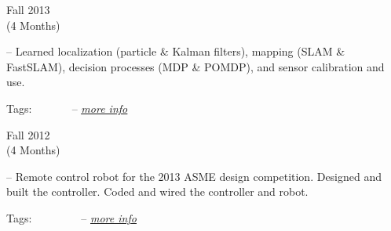 
%

\flushleft \begin{minipage}[t]{\dateColWidth}
Fall 2013 \\
(4 Months)
\end{minipage}
\begin{minipage}[t]{0.8\textwidth}
	--
	Learned localization (particle \& Kalman filters), mapping (SLAM \& FastSLAM), decision processes (MDP \& POMDP), and sensor calibration and use.
	
	Tags:
	 \vline\
	 \vline\
	 \vline\
	 \vline\
	--
	\href{http://claytonketner.com/intro-to-robotics-class}{\uline{\textit{more info}}}
\end{minipage}

\divLine

\flushleft \begin{minipage}[t]{\dateColWidth}
Fall 2012 \\
(4 Months)
\end{minipage}
\begin{minipage}[t]{0.8\textwidth}
	--
	Remote control robot for the 2013 ASME design competition. Designed and built the controller. Coded and wired the controller and robot.

	Tags:
	 \vline\ 
	 \vline\ 
	 \vline\ 
	 \vline\ 
	 \vline\ 
	--
	\href{http://www.claytonketner.com/senior-project-robot/}{\uline{\textit{more info}}}
\end{minipage}

